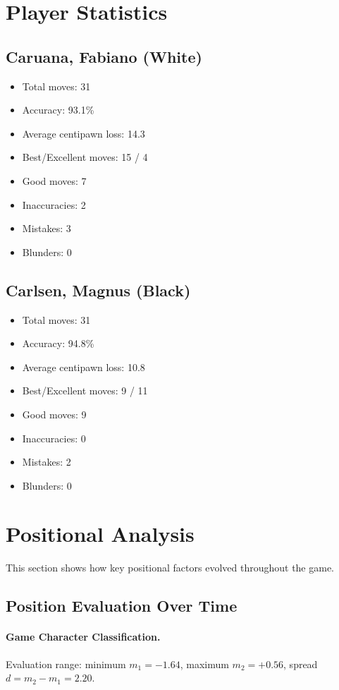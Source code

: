 \documentclass[11pt]{book}
\begin{document}
\section{Player Statistics}

\subsection{Caruana, Fabiano (White)}
\begin{itemize}
\item Total moves: 31
\item Accuracy: 93.1\%
\item Average centipawn loss: 14.3
\item Best/Excellent moves: 15 / 4
\item Good moves: 7
\item Inaccuracies: 2
\item Mistakes: 3
\item Blunders: 0
\end{itemize}

\subsection{Carlsen, Magnus (Black)}
\begin{itemize}
\item Total moves: 31
\item Accuracy: 94.8\%
\item Average centipawn loss: 10.8
\item Best/Excellent moves: 9 / 11
\item Good moves: 9
\item Inaccuracies: 0
\item Mistakes: 2
\item Blunders: 0
\end{itemize}

\section{Positional Analysis}

This section shows how key positional factors evolved throughout the game.

\subsection{Position Evaluation Over Time}

\paragraph{Game Character Classification.}
Evaluation range: minimum $m_1 = -1.64$, maximum $m_2 = +0.56$, spread $d = m_2 - m_1 = 2.20$.
\end{document}
